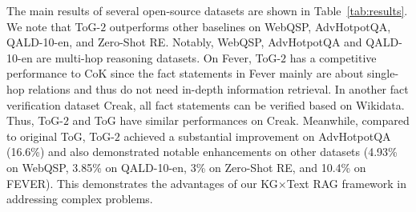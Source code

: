 \documentclass{article} %
\begin{document}
\begin{table}[!t]
    \centering
    \renewcommand{\arraystretch}{1.1} 
    \caption{ToG-FinQA Results}
    \label{tab:results_fin}
    \vspace{-0.6cm}
\end{table}


The main results of several open-source datasets are shown in Table~\ref{tab:results}. We note that ToG-$2$ outperforms other baselines on WebQSP, AdvHotpotQA, QALD-10-en, and Zero-Shot RE. Notably, WebQSP, AdvHotpotQA and QALD-10-en are multi-hop reasoning datasets. On Fever, ToG-$2$ has a competitive performance to CoK since the fact statements in Fever mainly are about single-hop relations and thus do not need in-depth information retrieval. In another fact verification dataset Creak, all fact statements can be verified based on Wikidata. Thus, ToG-$2$ and ToG have similar performances on Creak. Meanwhile, compared to original ToG, ToG-$2$ achieved a substantial improvement on AdvHotpotQA (16.6\%) and also demonstrated notable enhancements on other datasets (4.93\% on WebQSP, 3.85\% on QALD-10-en, 3\% on Zero-Shot RE, and 10.4\% on FEVER). This demonstrates the advantages of our KG$\times$Text RAG framework in addressing complex problems. 
\end{document}

